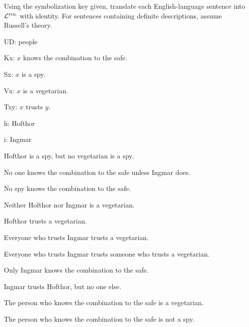 \solutions
\problempart
\label{pr.$\FOL$-ID-spies}
Using the symbolization key given, translate each English-language sentence into $\FOL$ with identity. For sentences containing definite descriptions, assume Russell's theory.
\begin{ekey}
\item[UD:] people
\item[Kx:] $x$ knows the combination to the safe.
\item[Sx:] $x$ is a spy.
\item[Vx:] $x$ is a vegetarian.
\item[Txy:] $x$ trusts $y$.
\item[h:] Hofthor
\item[i:] Ingmar
\end{ekey}
\begin{earg}
\item Hofthor is a spy, but no vegetarian is a spy.
\item No one knows the combination to the safe unless Ingmar does.
\item No spy knows the combination to the safe.
\item Neither Hofthor nor Ingmar is a vegetarian.
\item Hofthor trusts a vegetarian.
\item Everyone who trusts Ingmar trusts a vegetarian.
\item Everyone who trusts Ingmar trusts someone who trusts a vegetarian.
\item Only Ingmar knows the combination to the safe.
\item Ingmar trusts Hofthor, but no one else.
\item The person who knows the combination to the safe is a vegetarian.
\item The person who knows the combination to the safe is not a spy.
\end{earg}

